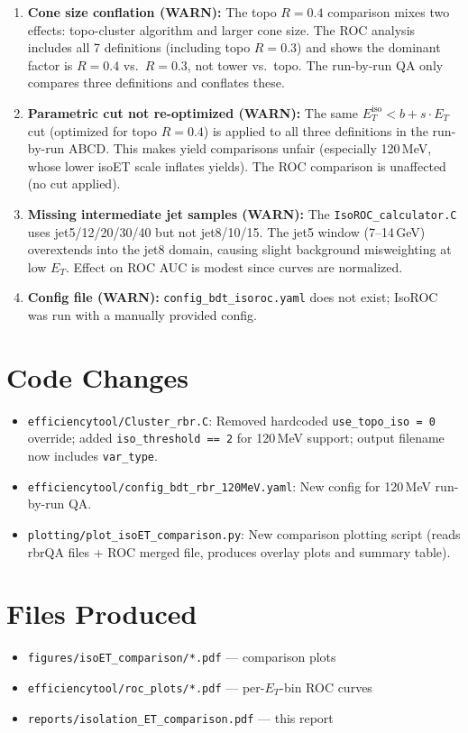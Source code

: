 \documentclass[11pt]{article}
\begin{document}
\begin{enumerate}
  \item \textbf{Cone size conflation (WARN):} The topo $R=0.4$ comparison
    mixes two effects: topo-cluster algorithm and larger cone size.  The
    ROC analysis includes all 7 definitions (including topo $R=0.3$) and
    shows the dominant factor is $R=0.4$ vs.\ $R=0.3$, not tower vs.\ topo.
    The run-by-run QA only compares three definitions and conflates these.
  \item \textbf{Parametric cut not re-optimized (WARN):} The same
    $E_T^{\mathrm{iso}} < b + s \cdot E_T$ cut (optimized for topo $R=0.4$)
    is applied to all three definitions in the run-by-run ABCD.  This
    makes yield comparisons unfair (especially 120\,MeV, whose lower
    isoET scale inflates yields).  The ROC comparison is unaffected
    (no cut applied).
  \item \textbf{Missing intermediate jet samples (WARN):} The
    \texttt{IsoROC\_calculator.C} uses jet5/12/20/30/40 but not jet8/10/15.
    The jet5 window (7--14\,GeV) overextends into the jet8 domain, causing
    slight background misweighting at low $E_T$.  Effect on ROC AUC is
    modest since curves are normalized.
  \item \textbf{Config file (WARN):} \texttt{config\_bdt\_isoroc.yaml} does
    not exist; IsoROC was run with a manually provided config.
\end{enumerate}

\section{Code Changes}

\begin{itemize}
  \item \texttt{efficiencytool/Cluster\_rbr.C}: Removed hardcoded
        \texttt{use\_topo\_iso = 0} override; added \texttt{iso\_threshold == 2}
        for 120\,MeV support; output filename now includes \texttt{var\_type}.
  \item \texttt{efficiencytool/config\_bdt\_rbr\_120MeV.yaml}: New config for
        120\,MeV run-by-run QA.
  \item \texttt{plotting/plot\_isoET\_comparison.py}: New comparison plotting
        script (reads rbrQA files + ROC merged file, produces overlay plots
        and summary table).
\end{itemize}

\section{Files Produced}

\begin{itemize}
  \item \texttt{figures/isoET\_comparison/*.pdf} --- comparison plots
  \item \texttt{efficiencytool/roc\_plots/*.pdf} --- per-$E_T$-bin ROC curves
  \item \texttt{reports/isolation\_ET\_comparison.pdf} --- this report
\end{itemize}
\end{document}
